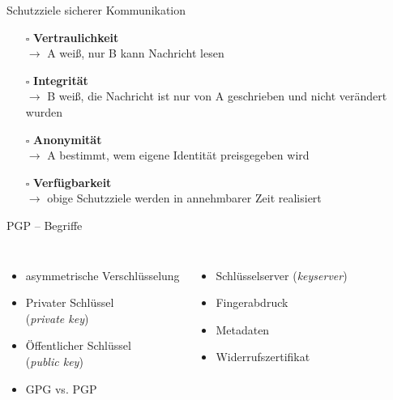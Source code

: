\documentclass{beamer}
\begin{document}
\begin{frame}{Schutzziele sicherer Kommunikation}

  \begin{itemize}
   \item[$\square$] \textbf{Vertraulichkeit}\\
   $\rightarrow$ A weiß, nur B kann Nachricht lesen

   \pause

   \item[$\square$] \textbf{Integrität}\\
   $\rightarrow$ B weiß, die Nachricht ist nur von A geschrieben und nicht verändert wurden

   \pause

   \item[$\square$] \textbf{Anonymität}\\
   $\rightarrow$ A bestimmt, wem eigene Identität preisgegeben wird

   \pause

   \item[$\square$] \textbf{Verfügbarkeit}\\
   $\rightarrow$ obige Schutzziele werden in annehmbarer Zeit realisiert
  \end{itemize}

\end{frame}
 

\begin{frame}{PGP – Begriffe}
  
  \begin{columns}
  \begin{itemize}
   \item asymmetrische Verschlüsselung
   \item Privater Schlüssel\\(\textit{private key})
   \item Öffentlicher Schlüssel\\(\textit{public key})
   \item GPG vs. PGP
  \end{itemize}

  \pause

  \begin{itemize}
   \item Schlüsselserver (\textit{keyserver})
   \item Fingerabdruck
   \item Metadaten
   \item Widerrufszertifikat
  \end{itemize}
\end{columns}
\end{frame}
\end{document}
